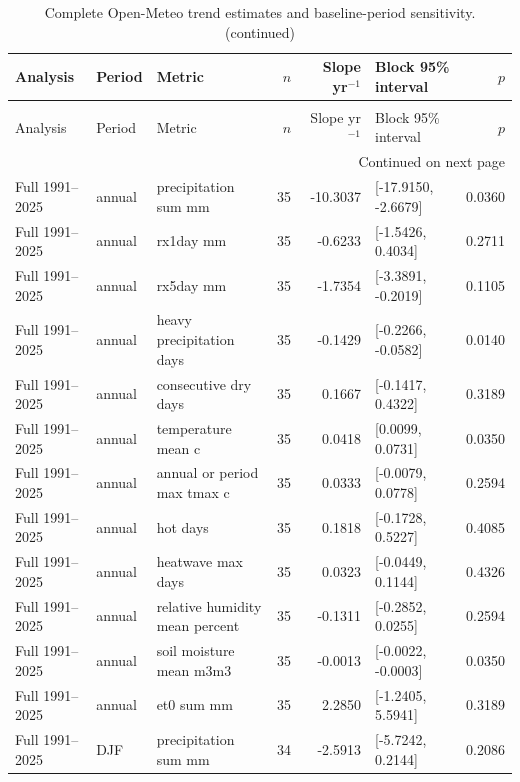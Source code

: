 \begingroup
\scriptsize
\setlength{\tabcolsep}{3pt}
\begin{longtable}{p{}p{}p{}r r p{}r}
\caption{Complete Open-Meteo trend estimates and baseline-period sensitivity.}\label{tab:s-climate-trends}\\
\toprule
Analysis & Period & Metric & $n$ & Slope yr$^{-1}$ & Block 95\% interval & $p$ \\
\midrule
\endfirsthead
\caption[]{Complete Open-Meteo trend estimates and baseline-period sensitivity. (continued)}\\
\toprule
Analysis & Period & Metric & $n$ & Slope yr$^{-1}$ & Block 95\% interval & $p$ \\
\midrule
\endhead
\midrule
\multicolumn{7}{r}{Continued on next page}\\
\endfoot
\bottomrule
\endlastfoot
Full 1991--2025 & annual & precipitation sum mm & 35 & -10.3037 & [-17.9150, -2.6679] & 0.0360 \\
Full 1991--2025 & annual & rx1day mm & 35 & -0.6233 & [-1.5426, 0.4034] & 0.2711 \\
Full 1991--2025 & annual & rx5day mm & 35 & -1.7354 & [-3.3891, -0.2019] & 0.1105 \\
Full 1991--2025 & annual & heavy precipitation days & 35 & -0.1429 & [-0.2266, -0.0582] & 0.0140 \\
Full 1991--2025 & annual & consecutive dry days & 35 & 0.1667 & [-0.1417, 0.4322] & 0.3189 \\
Full 1991--2025 & annual & temperature mean c & 35 & 0.0418 & [0.0099, 0.0731] & 0.0350 \\
Full 1991--2025 & annual & annual or period max tmax c & 35 & 0.0333 & [-0.0079, 0.0778] & 0.2594 \\
Full 1991--2025 & annual & hot days & 35 & 0.1818 & [-0.1728, 0.5227] & 0.4085 \\
Full 1991--2025 & annual & heatwave max days & 35 & 0.0323 & [-0.0449, 0.1144] & 0.4326 \\
Full 1991--2025 & annual & relative humidity mean percent & 35 & -0.1311 & [-0.2852, 0.0255] & 0.2594 \\
Full 1991--2025 & annual & soil moisture mean m3m3 & 35 & -0.0013 & [-0.0022, -0.0003] & 0.0350 \\
Full 1991--2025 & annual & et0 sum mm & 35 & 2.2850 & [-1.2405, 5.5941] & 0.3189 \\
Full 1991--2025 & DJF & precipitation sum mm & 34 & -2.5913 & [-5.7242, 0.2144] & 0.2086 \\

\end{longtable}
